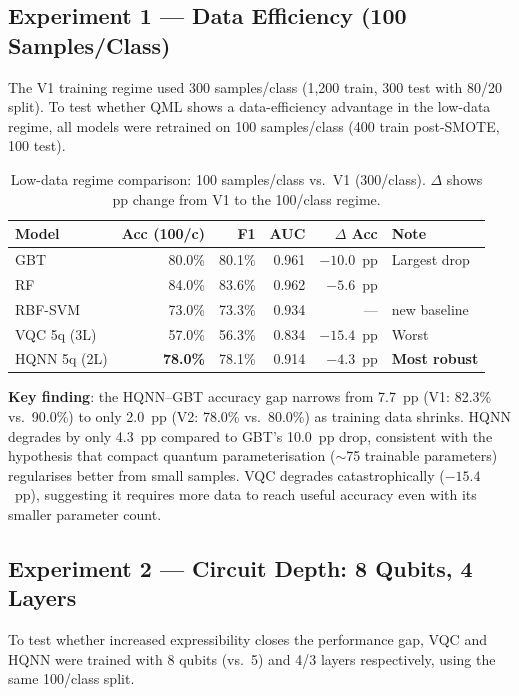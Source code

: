 \documentclass[journal]{IEEEtran}
\begin{document}
\subsection{Experiment 1 — Data Efficiency (100 Samples/Class)}

The V1 training regime used 300 samples/class (1,200 train, 300 test with
80/20 split). To test whether QML shows a data-efficiency advantage in the
low-data regime, all models were retrained on 100 samples/class (400 train
post-SMOTE, 100 test).

\begin{table}[H]
\centering
\caption{Low-data regime comparison: 100 samples/class vs.\ V1 (300/class).
         $\Delta$ shows pp change from V1 to the 100/class regime.}
\begin{tabular}{lrrrrl}
\toprule
\textbf{Model} & \textbf{Acc (100/c)} & \textbf{F1} & \textbf{AUC} & \textbf{$\Delta$ Acc} & \textbf{Note} \\
\midrule
GBT            & 80.0\% & 80.1\% & 0.961 & $-10.0$~pp & Largest drop \\
RF             & 84.0\% & 83.6\% & 0.962 & $-5.6$~pp  & \\
RBF-SVM        & 73.0\% & 73.3\% & 0.934 & —          & new baseline \\
VQC 5q (3L)   & 57.0\% & 56.3\% & 0.834 & $-15.4$~pp & Worst \\
HQNN 5q (2L)  & \textbf{78.0\%} & 78.1\% & 0.914 & $-4.3$~pp  & \textbf{Most robust} \\
\bottomrule
\end{tabular}
\end{table}

\noindent\textbf{Key finding}: the HQNN--GBT accuracy gap narrows from 7.7~pp
(V1: 82.3\% vs.\ 90.0\%) to only 2.0~pp (V2: 78.0\% vs.\ 80.0\%) as training
data shrinks. HQNN degrades by only 4.3~pp compared to GBT's 10.0~pp drop,
consistent with the hypothesis that compact quantum parameterisation
($\sim$75 trainable parameters) regularises better from small samples.
VQC degrades catastrophically ($-15.4$~pp), suggesting it requires more
data to reach useful accuracy even with its smaller parameter count.

\subsection{Experiment 2 — Circuit Depth: 8 Qubits, 4 Layers}

To test whether increased expressibility closes the performance gap,
VQC and HQNN were trained with 8 qubits (vs.\ 5) and 4/3 layers respectively,
using the same 100/class split.
\end{document}
